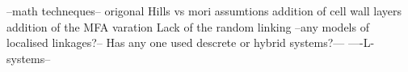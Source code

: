 --math techneques--
origonal Hills vs mori assumtions 
addition of cell wall layers
addition of the MFA varation
Lack of the random linking
--any models of localised linkages?--
Has any one used descrete or hybrid systems?---
----L-systems--